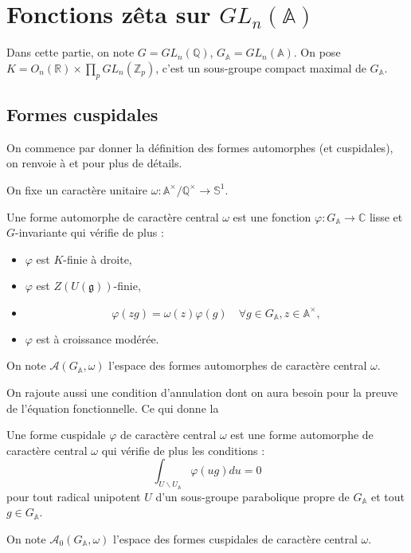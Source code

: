 \section{Fonctions zêta sur $GL_n(\mathbb{A})$}

Dans cette partie, on note $G = GL_n(\mathbb{Q})$, $G_\mathbb{A}=GL_n(\mathbb{A})$. On pose $K = O_n(\mathbb{R}) \times \prod_p GL_n(\mathbb{Z}_p)$, c'est un sous-groupe compact maximal de $G_\mathbb{A}$.

\subsection{Formes cuspidales}
On commence par donner la définition des formes automorphes (et cuspidales), on renvoie à \cite{bump} et \cite{goldfeld-hundley} pour plus de détails.

On fixe un caractère unitaire $\omega : \mathbb{A}^\times/\mathbb{Q}^\times \rightarrow \mathbb{S}^1$.

\begin{definition}
Une forme automorphe de caractère central $\omega$ est une fonction $\varphi : G_\mathbb{A} \rightarrow \mathbb{C}$ lisse et $G$-invariante qui vérifie de plus :
\begin{itemize}
\item $\varphi$ est $K$-finie à droite,
\item $\varphi$ est $Z(U(\mathfrak{g}))$-finie,
\item \begin{equation}
\varphi(zg) = \omega(z)\varphi(g) \quad \forall g \in G_\mathbb{A}, z \in \mathbb{A}^\times,
\end{equation}
\item $\varphi$ est à croissance modérée.
\end{itemize}

On note $\mathcal{A}(G_\mathbb{A}, \omega)$ l'espace des formes automorphes de caractère central $\omega$.
\end{definition}

On rajoute aussi une condition d'annulation dont on aura besoin pour la preuve de l'équation fonctionnelle. Ce qui donne la
\begin{definition}
Une forme cuspidale $\varphi$ de caractère central $\omega$ est une forme automorphe de caractère central $\omega$ qui vérifie de plus les conditions :
\begin{equation}
\int_{U \backslash U_\mathbb{A}} \varphi(ug) du = 0
\end{equation}
pour tout radical unipotent $U$ d'un sous-groupe parabolique propre de $G_\mathbb{A}$ et tout $g \in G_\mathbb{A}$.

On note $\mathcal{A}_0(G_\mathbb{A}, \omega)$ l'espace des formes cuspidales de caractère central $\omega$.
\end{definition}

